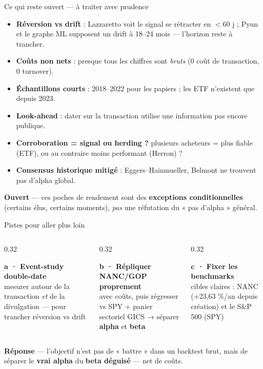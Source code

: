 \documentclass[11pt,aspectratio=169]{beamer}
\newcommand{\carte}[3]{%
  \colorbox{#1!10}{\parbox[t][23mm][t]{\dimexpr\linewidth-8pt}{\vspace{1mm}
    {\color{#1}\footnotesize\textbf{#2}}\\[0.8mm]{\scriptsize #3}}}}
\newcommand{\repband}[1]{%
  \colorbox{okgreen!12}{\parbox{\dimexpr\textwidth-10pt}{\scriptsize
    \textbf{\textcolor{okgreen}{Réponse}}\; --- #1}}}
\newcommand{\tension}[1]{%
  \colorbox{warnorange!12}{\parbox{\dimexpr\textwidth-10pt}{\scriptsize
    \textbf{\textcolor{warnorange}{Ouvert}}\; --- #1}}}
\begin{document}
\begin{frame}{Ce qui reste ouvert --- à traiter avec prudence}
  {\small
  \begin{itemize}\setlength{\itemsep}{1.3mm}
    \item[\textcolor{warnorange}{$\bullet$}] \textbf{Réversion vs drift} : Lazzaretto voit le signal se rétracter en $<$60 j ; Pyun et le graphe ML supposent un drift à 18--24 mois --- l'horizon reste à trancher.
    \item[\textcolor{warnorange}{$\bullet$}] \textbf{Coûts non nets} : presque tous les chiffres sont \emph{bruts} (0 coût de transaction, 0 turnover).
    \item[\textcolor{warnorange}{$\bullet$}] \textbf{Échantillons courts} : 2018--2022 pour les papiers ; les ETF n'existent que depuis 2023.
    \item[\textcolor{warnorange}{$\bullet$}] \textbf{Look-ahead} : dater sur la transaction utilise une information pas encore publique.
    \item[\textcolor{warnorange}{$\bullet$}] \textbf{Corroboration = signal ou herding ?} plusieurs acheteurs = plus fiable (ETF), ou au contraire moins performant (Herron) ?
    \item[\textcolor{warnorange}{$\bullet$}] \textbf{Consensus historique mitigé} : Eggers--Hainmueller, Belmont ne trouvent pas d'alpha global.
  \end{itemize}}
  \vspace{1mm}
  \tension{ces poches de rendement sont des \textbf{exceptions conditionnelles} (certains élus, certains moments), \emph{pas} une réfutation du « pas d'alpha » général.}
\end{frame}

\begin{frame}{Pistes pour aller plus loin}
  \centering
  \vspace{1mm}
  \begin{columns}[T]
    \begin{column}{0.32\textwidth}
      \carte{helec}{a · Event-study double-date}{mesurer autour de la transaction \emph{et} de la divulgation --- pour trancher réversion vs drift}
    \end{column}
    \begin{column}{0.32\textwidth}
      \carte{okgreen}{b · Répliquer NANC/GOP proprement}{avec coûts, puis régresser vs SPY + panier sectoriel GICS → séparer \textbf{alpha} et \textbf{beta}}
    \end{column}
    \begin{column}{0.32\textwidth}
      \carte{grisC}{c · Fixer les benchmarks}{cibles claires : NANC ($+$23,63 \%/an depuis création) et le S\&P 500 (SPY)}
    \end{column}
  \end{columns}\par\vspace{5mm}
  \repband{l'objectif n'est pas de « battre » dans un backtest brut, mais de séparer le \textbf{vrai alpha}
   du \textbf{beta déguisé} --- net de coûts.}
\end{frame}
\end{document}
